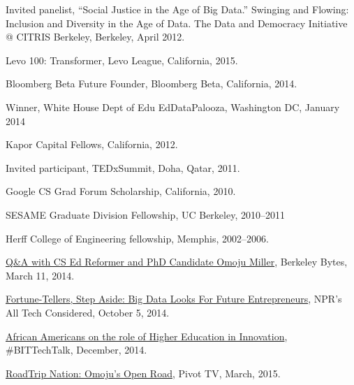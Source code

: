 \documentclass[11pt,article,oneside]{memoir}
\begin{document}
\ind Invited panelist, ``Social Justice in the Age of Big Data.'' Swinging and Flowing: Inclusion and Diversity in the Age of Data. The Data and Democracy Initiative @ CITRIS Berkeley, Berkeley, April 2012.

\bigskip 

\medskip

\ind Levo 100: Transformer, Levo League, California, 2015.

\ind Bloomberg Beta Future Founder, Bloomberg Beta, California, 2014. 

\ind Winner, White House Dept of Edu EdDataPalooza, Washington DC, January 2014

\ind Kapor Capital Fellows, California, 2012.

\ind Invited participant, TEDxSummit, Doha, Qatar, 2011.

\ind Google CS Grad Forum Scholarship, California, 2010.

\ind SESAME Graduate Division Fellowship, UC Berkeley, 2010--2011

\ind Herff College of Engineering fellowship, Memphis, 2002--2006.

\bigskip 

\medskip

\ind \href{http://best.berkeley.edu/2015/03/11/best-labber-in-berkeley-byte-qa-with-cs-ed-reformer-and-phd-candidate-omoju-miller/}{Q\&A with CS Ed Reformer and PhD Candidate Omoju Miller}, Berkeley Bytes, March 11, 2014.

\ind \href{http://www.npr.org/sections/alltechconsidered/2014/10/05/351851015/fortune-tellers-step-aside-big-data-looks-for-future-entrepreneurs}{Fortune-Tellers, Step Aside: Big Data Looks For Future Entrepreneurs}, NPR's  All Tech Considered, October 5, 2014.

\ind \href{https://www.blacksintechnology.net/the-road-to-50-podcast-african-americans-on-the-role-of-higher-education-in-innovation/}{African Americans on the role of Higher Education in Innovation}, \#BITTechTalk, December, 2014.

\ind \href{http://roadtripnation.com/leader/omoju-miller}{RoadTrip Nation: Omoju's Open Road}, Pivot TV, March, 2015.
\end{document}
